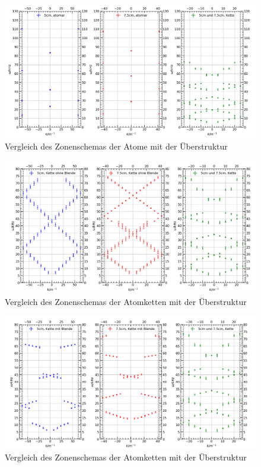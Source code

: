 \documentclass[german,  %
parskip=full,  %
]{scrartcl}
\begin{document}
\begin{figure}[h!]
\centering
\includegraphics[width=\textwidth]{4632_Vergleich_mit_Atomen.png}
\caption{Vergleich des Zonenschemas der Atome mit der Überstruktur}
\end{figure}
\begin{figure}[h!]
\centering
\includegraphics[width=\textwidth]{4632_Vergleich_mit_Atomketten_ohne_Blenden.png}
\caption{Vergleich des Zonenschemas der Atomketten mit der Überstruktur}
\end{figure}
\newpage
\begin{figure}[h!]
\centering
\includegraphics[width=\textwidth]{4632_Vergleich_mit_Atomketten_mit_Blenden.png}
\caption{Vergleich des Zonenschemas der Atomketten mit der Überstruktur}
\end{figure}
\end{document}
